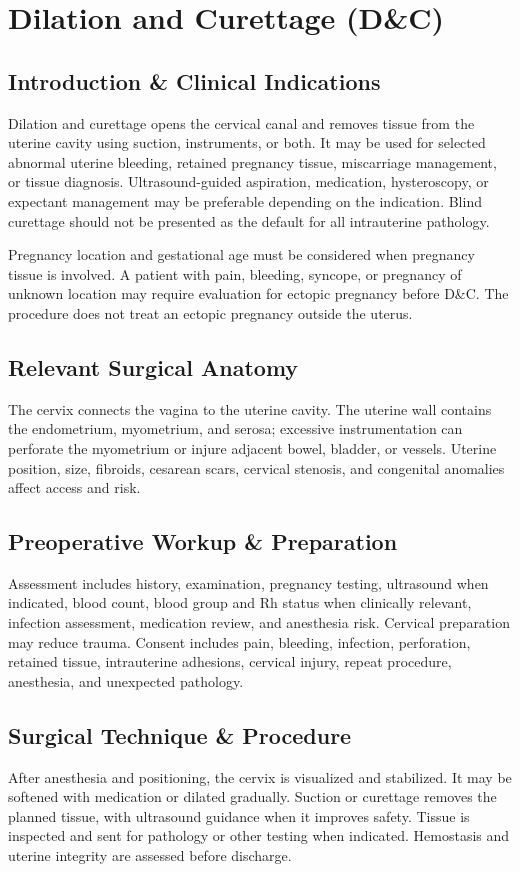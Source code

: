 \chapter{Dilation and Curettage (D\&C)}

\section*{Introduction \& Clinical Indications}
Dilation and curettage opens the cervical canal and removes tissue from the uterine cavity using suction, instruments, or both. It may be used for selected abnormal uterine bleeding, retained pregnancy tissue, miscarriage management, or tissue diagnosis. Ultrasound-guided aspiration, medication, hysteroscopy, or expectant management may be preferable depending on the indication. Blind curettage should not be presented as the default for all intrauterine pathology.

Pregnancy location and gestational age must be considered when pregnancy tissue is involved. A patient with pain, bleeding, syncope, or pregnancy of unknown location may require evaluation for ectopic pregnancy before D\&C. The procedure does not treat an ectopic pregnancy outside the uterus.

\section*{Relevant Surgical Anatomy}
The cervix connects the vagina to the uterine cavity. The uterine wall contains the endometrium, myometrium, and serosa; excessive instrumentation can perforate the myometrium or injure adjacent bowel, bladder, or vessels. Uterine position, size, fibroids, cesarean scars, cervical stenosis, and congenital anomalies affect access and risk.

\section*{Preoperative Workup \& Preparation}
Assessment includes history, examination, pregnancy testing, ultrasound when indicated, blood count, blood group and Rh status when clinically relevant, infection assessment, medication review, and anesthesia risk. Cervical preparation may reduce trauma. Consent includes pain, bleeding, infection, perforation, retained tissue, intrauterine adhesions, cervical injury, repeat procedure, anesthesia, and unexpected pathology.

\section*{Surgical Technique \& Procedure}
After anesthesia and positioning, the cervix is visualized and stabilized. It may be softened with medication or dilated gradually. Suction or curettage removes the planned tissue, with ultrasound guidance when it improves safety. Tissue is inspected and sent for pathology or other testing when indicated. Hemostasis and uterine integrity are assessed before discharge.

